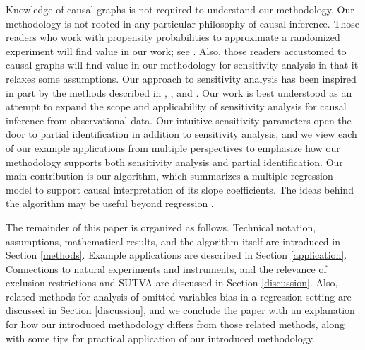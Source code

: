\documentclass[11pt]{amsart}
\begin{document}
%
%    
%    

Knowledge of causal graphs is not required to understand our methodology. Our methodology is not rooted in any particular philosophy of causal inference. Those readers who work with propensity probabilities to approximate a randomized experiment will find value in our work; see \citep{Knaeble2023, Knaeble2024}. Also, those readers accustomed to causal graphs will find value in our methodology for sensitivity analysis in that it relaxes some assumptions. Our approach to sensitivity analysis has been inspired in part by the methods described in \citep{Frank}, \citep{SAWA}, and \citep[Chapter 3.4]{Rose10}. Our work is best understood as an attempt to expand the scope and applicability of sensitivity analysis for causal inference from observational data. Our intuitive sensitivity parameters open the door to partial identification in addition to sensitivity analysis, and we view each of our example applications from multiple perspectives to emphasize how our methodology supports both sensitivity analysis and partial identification. Our main contribution is our algorithm, which summarizes a multiple regression model to support causal interpretation of its slope coefficients. The ideas behind the algorithm may be useful beyond regression \citep{Pearl2013}.

The remainder of this paper is organized as follows. Technical notation, assumptions, mathematical results, and the algorithm itself are introduced in Section \ref{methods}. Example applications are described in Section \ref{application}. Connections to natural experiments and instruments, and the relevance of exclusion restrictions and SUTVA are discussed in Section \ref{discussion}. Also, related methods for analysis of omitted variables bias in a regression setting are discussed in Section \ref{discussion}, and we conclude the paper with an explanation for how our introduced methodology differs from those related methods, along with some tips for practical application of our introduced methodology. 
\end{document}
